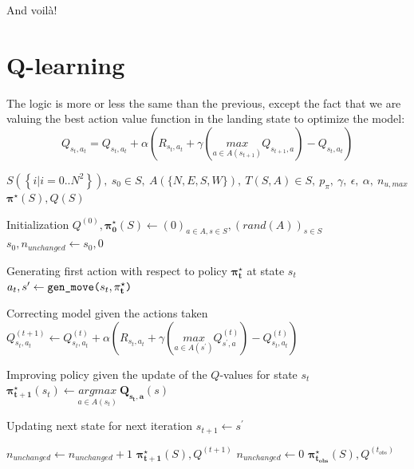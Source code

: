\documentclass{cfg}
\begin{document}
\noindent And voilà!

\newpage
\section{Q-learning}
\noindent The logic is more or less the same than the previous, except the fact that we are valuing the best action value function in the landing state to optimize the model:
\begin{equation}
    Q_{s_t, a_t} = Q_{s_t, a_t} + \alpha \left(
        R_{s_t, a_t} + \gamma \left(
            \underset{a \in A(s_{t+1})}{max} Q_{s_{t+1}, a} 
        \right) - Q_{s_t, a_t}
    \right)
\end{equation}


\begin{algorithmic} 
    \REQUIRE $S(\left\{i|i=0..N^2\right\}),~s_0\in S, ~ A(\{N, E, S, W\}),~ T(S, A) \in S,~ p_{\pi},~ \gamma,~ \epsilon,~ \alpha,~ n_{u, max}$
    \ENSURE $\mathbf{\pi^\star}(S), Q(S)$
    \STATE


    \STATE\COMMENT Initialization
    \STATE $Q^{(0)}, \mathbf{\pi^{\star}_0}(S) \gets (0)_{a\in A, s\in S}, (rand(A))_{s \in S}$
    \STATE $s_0, n_{unchanged} \gets s_0, 0$
    \STATE

        \STATE\COMMENT Generating first action with respect to policy $\mathbf{\pi^{\star}_{t}}$ at state $s_t$
        \STATE $a_t, s^\prime \gets \mbox{\texttt{gen\_move(}} s_{t}, \mathbf{\pi^{\star}_{t}} \mbox{\texttt{)}}$
        \STATE

        \STATE\COMMENT Correcting model given the actions taken
        \STATE $
            Q^{(t+1)}_{s_t, a_t} 
            \gets 
            Q^{(t)}_{s_t, a_t} 
            + \alpha \left(
                R_{s_t, a_t} 
                + \gamma \left(
                    \underset{a \in A(s^\prime)}{max} Q^{(t)}_{s^\prime, a} 
                \right) 
                - Q^{(t)}_{s_t, a_t}
            \right)
        $

        \STATE\COMMENT Improving policy given the update of the $Q$-values for state $s_t$
        \STATE $
            \mathbf{\pi^{\star}_{t+1}}(s_t) 
            \gets
            \underset{a \in A(s_t)}{argmax}~
            \mathbf{Q_{s_t, a}}(s)
        $
        \STATE

        \STATE\COMMENT Updating next state for next iteration
        \STATE $s_{t+1} \gets s^\prime$
        \STATE

            \STATE $n_{unchanged} \gets n_{unchanged} + 1$
                \RETURN $\mathbf{\pi^\star_{t+1}}(S), Q^{(t+1)}$
            \ENDIF
        \ELSE
            \STATE $n_{unchanged} \gets 0$
        \ENDIF
    \ENDFOR
    \RETURN $\mathbf{\pi^\star_{t_{obs}}}(S), Q^{(t_{obs})}$
\end{algorithmic}
\end{document}
